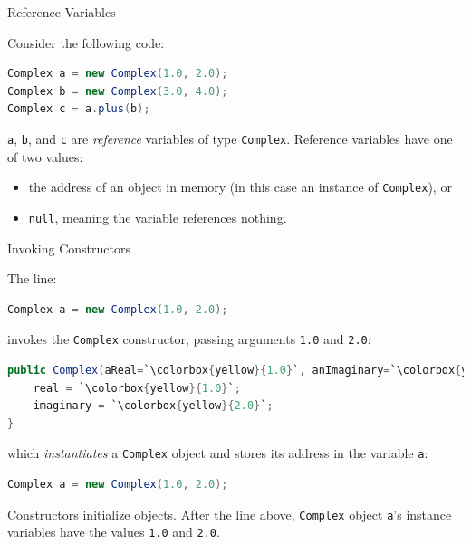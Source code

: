 \documentclass{beamer}
\begin{document}
\begin{frame}[fragile]{Reference Variables}


Consider the following code:
\begin{lstlisting}[language=Java]
Complex a = new Complex(1.0, 2.0);
Complex b = new Complex(3.0, 4.0);
Complex c = a.plus(b);
\end{lstlisting}

{\tt a}, {\tt b}, and {\tt c} are {\it reference} variables of type {\tt Complex}.  Reference variables have one of two values:

\begin{itemize}
\item the address of an object in memory (in this case an instance of {\tt Complex}), or
\item {\tt null}, meaning the variable references nothing.
\end{itemize}

\end{frame}

\begin{frame}[fragile]{Invoking Constructors}


The line:
\begin{lstlisting}[language=Java]
Complex a = new Complex(1.0, 2.0);
\end{lstlisting}

invokes the {\tt Complex} constructor, passing arguments {\tt 1.0} and {\tt 2.0}:

\begin{lstlisting}[language=Java,escapechar=`]
public Complex(aReal=`\colorbox{yellow}{1.0}`, anImaginary=`\colorbox{yellow}{2.0}`) {
    real = `\colorbox{yellow}{1.0}`;
    imaginary = `\colorbox{yellow}{2.0}`;
}
\end{lstlisting}

which {\it instantiates} a {\tt Complex} object and stores its address in the variable {\tt a}:

\begin{lstlisting}[language=Java]
Complex a = new Complex(1.0, 2.0);
\end{lstlisting}
Constructors initialize objects.  After the line above, {\tt Complex} object {\tt a}'s instance variables have the values {\tt 1.0} and {\tt 2.0}.

\end{frame}
\end{document}
